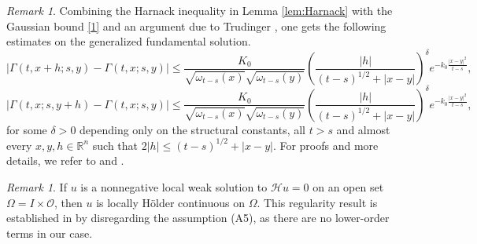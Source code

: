 \documentclass[12pt, letterpaper]{amsart}
\theoremstyle{definition}
\theoremstyle{remark}
\newtheorem{rem}[thm]{Remark}
\numberwithin{equation}{section}
\begin{document}
\begin{rem}

  Combining the Harnack inequality in Lemma \eqref{lem:Harnack} with the Gaussian bound \eqref{1} and an argument due to Trudinger \cite[Thm. 2.2]{trudinger1968pointwise}, one gets the following estimates on the generalized fundamental solution.
\begin{equation*}
    \left | \Gamma(t,x+h;s,y) -\Gamma(t,x;s,y)\right | \leq \frac{K_0}{\sqrt{\omega_{t-s}(x)}\sqrt{\omega_{t-s}(y)}}\left ( \frac{\left | h \right |}{(t-s)^{1/2}+\left | x-y \right |} \right )^\delta  e^{-k_0 \frac{\left | x-y \right |^2}{t-s}},
\end{equation*}
\begin{equation*}
    \left | \Gamma(t,x;s,y+h) -\Gamma(t,x;s,y)\right | \leq \frac{K_0}{\sqrt{\omega_{t-s}(x)}\sqrt{\omega_{t-s}(y)}}\left ( \frac{\left | h \right |}{(t-s)^{1/2}+\left | x-y \right |} \right )^\delta  e^{-k_0 \frac{\left | x-y \right |^2}{t-s}},
\end{equation*}
for some $\delta>0$ depending only on the structural constants, all $t>s$ and almost every $ x,y,h \in \mathbb{R}^n$ such that $2\left | h \right |\leq (t-s)^{1/2}+\left | x-y \right |$. For proofs and more details, we refer to \cite{ataei2024fundamental} and \cite{trudinger1968pointwise}.
\end{rem}
\begin{rem}\label{rem:Holder régularité}
    If \( u \) is a nonnegative local weak solution to \( \mathcal{H}u = 0 \) on an open set \( \Omega= I \times \mathcal{O}\), then \( u \) is locally Hölder continuous on \( \Omega \). This regularity result is established in \cite[Thm. B]{ishige1999behavior} by disregarding the assumption (A5), as there are no lower-order terms in our case.
\end{rem}
\end{document}

